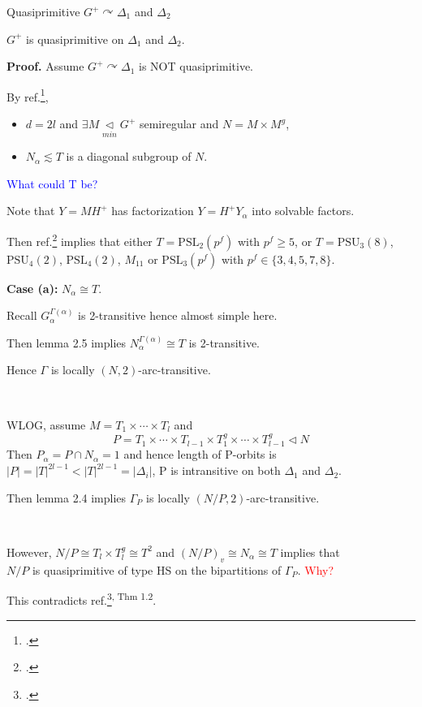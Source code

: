 \documentclass{beamer}
\def\PSL{\mathrm{PSL}}
\def\PSU{\mathrm{PSU}}
\begin{document}
\begin{frame}{Quasiprimitive $G^+\curvearrowright \Delta_1$ and $\Delta_2$} 
\begin{lemma}[4.6]
$G^+$ is quasiprimitive on $\Delta_1$ and $\Delta_2$.
\end{lemma}
\textbf{Proof. } Assume $G^+\curvearrowright\Delta_1$ is NOT quasiprimitive.


By ref.\footcite{LI2002197}, 
\begin{itemize}
	\item $d=2l$ and $\exists M\mathop{\triangleleft}\limits_{min} G^+$ semiregular and $N=M\times M^g$,
	\item $N_\alpha\lesssim T$ is a diagonal subgroup of $N$.
\end{itemize}

\textcolor{blue}{What could T be?}

Note that $Y=MH^+$ has factorization $Y=H^+Y_\alpha$ into solvable factors.

Then ref.\footcite{KAZARIN1986prodsol} implies that either $T=\PSL_2(p^f)$ with $p^f\geq 5$, or $T=\PSU_3(8)$, $\PSU_4(2)$, $\PSL_4(2)$, $M_{11}$ or $\PSL_3(p^f)$ with $p^f\in\{3,4,5,7,8\}$.
\end{frame}

\begin{frame}
\textbf{Case (a): } $N_\alpha\cong T$.

Recall $G_\alpha^{\Gamma(\alpha)}$ is 2-transitive hence almost simple here. 

Then lemma 2.5 implies $N_\alpha^{\Gamma(\alpha)}\cong T$ is 2-transitive.

Hence $\Gamma$ is locally $(N,2)$-arc-transitive.

\ 

WLOG, assume $M=T_1\times\cdots\times T_l$ and \[P=T_1\times\cdots\times T_{l-1}\times T_1^g\times \cdots\times T_{l-1}^g\triangleleft N\]
Then $P_\alpha=P\cap N_\alpha=1$ and hence length of P-orbits is $|P|=|T|^{2l-1}<|T|^{2l-1}=|\Delta_i|$, P is intransitive on both $\Delta_1$ and $\Delta_2$.

Then lemma 2.4 implies $\Gamma_P$ is locally $(N/P,2)$-arc-transitive.

\ 

However, $N/P\cong T_l\times T_l^g\cong T^2$ and $(N/P)_v\cong N_\alpha\cong T$ implies that \\$N/P$ is quasiprimitive of type HS on the bipartitions of $\Gamma_P$. \textcolor{red}{Why?}

This contradicts ref.\footcite{GIUDICI2003analysing}\textsuperscript{, Thm 1.2}.
\end{frame}
\end{document}
